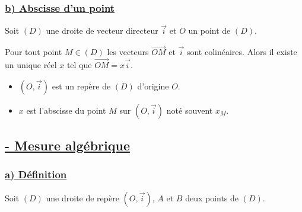 \documentclass[12pt,a4paper]{article}
\begin{document}
\subsubsection*{\centering \underline{\color{red}b) Abscisse d'un point}}

Soit $(D)$ une droite de vecteur directeur $\vec{i}$ et $O$ un point de $(D)$.

\begin{center}
\end{center}
Pour tout point $M \in (D)$ les vecteurs $\overrightarrow{OM}$ et $\vec{i}$ sont colinéaires. Alors il existe un unique réel $x$ tel que $\overrightarrow{OM} = x\vec{i}$.

\begin{itemize}
    \item[\color{red}*] $(O, \vec{i})$ est un repère de $(D)$ d'origine $O$.
    \item[\color{red}*] $x$ est l'abscisse du point $M$ sur $(O, \vec{i})$ noté souvent $x_M$.
\end{itemize}

\subsection*{\centering \underline{\color{red}- Mesure algébrique}}

\subsubsection*{\centering \underline{\color{red} a) Définition}}

Soit $(D)$ une droite de repère $(O, \vec{i})$, $A$ et $B$ deux points de $(D)$.
\end{document}
